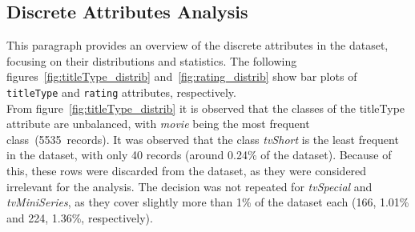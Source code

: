 \subsection{Discrete Attributes Analysis}
This paragraph provides an overview of the discrete attributes in the dataset, focusing on their distributions and statistics.
The following figures~\ref{fig:titleType_distrib} and~\ref{fig:rating_distrib} show bar plots of \texttt{titleType} and \texttt{rating} attributes, respectively.\\
From figure~\ref{fig:titleType_distrib} it is observed that the classes of the titleType attribute are unbalanced, with \textit{movie} being the most frequent class (5535 records).
It was observed that the class \textit{tvShort} is the least frequent in the dataset, with only 40 records (around 0.24\% of the dataset). Because of this, these rows were discarded from the dataset, as they were considered irrelevant for the analysis.
The decision was not repeated for \textit{tvSpecial} and \textit{tvMiniSeries}, as they cover slightly more than 1\% of the dataset each (166, 1.01\% and 224, 1.36\%, respectively). \\
